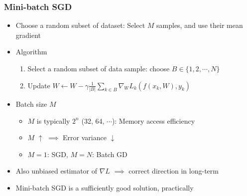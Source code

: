 \subsubsection*{Mini-batch SGD}
\begin{itemize}
    \item Choose a random subset of dataset: Select $M$ samples, and use their mean gradient
    \item Algorithm
    \begin{enumerate}
        \item Select a random subset of data sample: choose $B\in\{1,2,\cdots,N\}$
        \item Update $W\leftarrow W-\gamma\frac{1}{|B|}\sum_{k\in B}\nabla_WL_k(f(x_k,W),y_k)$
    \end{enumerate}
    \item Batch size $M$
    \begin{itemize}
        \item $M$ is typically $2^n$ (32, 64, $\cdots$): Memory access efficiency
        \item $M$ $\uparrow$ $\implies$ Error variance $\downarrow$
        \item $M=1$: SGD, $M=N$: Batch GD
    \end{itemize}
    \item Also unbiased estimator of $\nabla L$ $\implies$ correct direction in long-term
    \item Mini-batch SGD is a sufficiently good solution, practically
\end{itemize}

